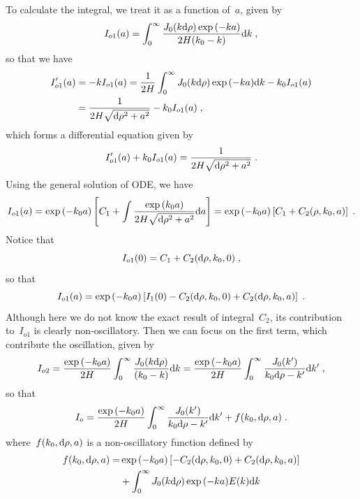 To calculate the integral, we treat it as a function of~$a$, given by
\begin{equation}
    I_{o1}(a) = \int_0^{\infty} \frac{J_0(k \mathrm{d} \rho) \exp{(-k a)}}{2H(k_0 - k)} \text{d}k\;,
\end{equation}
so that we have
\begin{equation}
    \begin{split}
    I_{o1}^{\prime}(a) & = - k I_{o1}(a) = \frac{1}{2H} \int_0^{\infty} J_0(k \mathrm{d} \rho) \exp{(-k a)} \text{d}k - k_0 I_{o1}(a) \\
    & = \frac{1}{2H \sqrt{\mathrm{d} \rho^2 + a^2}} - k_0 I_{o1}(a) \;,
    \end{split}
\end{equation}
which forms a differential equation given by
\begin{equation}
    I_{o1}^{\prime}(a) + k_0 I_{o1}(a) = \frac{1}{2H \sqrt{\mathrm{d} \rho^2 + a^2}}\;.
\end{equation}
Using the general solution of ODE, we have
\begin{equation}
    I_{o1}(a) = \exp{(-k_0 a)} \left[C_1 + \int \frac{\exp{(k_0 a)}}{2H \sqrt{\mathrm{d} \rho^2 + a^2}} \text{d}a \right] = \exp{(-k_0 a)} \left[C_1 + C_2(\rho, k_0, a) \right] \;.
\end{equation}
Notice that
\begin{equation}
    I_{o1}(0) = C_1 + C_2(\mathrm{d} \rho, k_0, 0)\;,
\end{equation}
so that
\begin{equation}
    I_{o1}(a) = \exp{(-k_0 a)} \left[ I_1(0) - C_2(\mathrm{d} \rho, k_0, 0) + C_2(\mathrm{d} \rho, k_0, a) \right]\;.
\end{equation}
Although here we do not know the exact result of integral~$C_2$, its contribution to~$I_{o1}$ is clearly non-oscillatory.
Then we can focus on the first term, which contribute the oscillation, given by 
\begin{equation}
    I_{o2} = \frac{\exp{(-k_0 a)}}{2H} \int_0^{\infty} \frac{J_0(k \mathrm{d} \rho)}{(k_0 - k)} \text{d}k = \frac{\exp{(-k_0 a)}}{2H} \int_0^{\infty} \frac{J_0(k^\prime)}{k_0 \mathrm{d} \rho - k^\prime} \text{d}k^\prime\;,
\end{equation}
so that 
\begin{equation}
    I_o = \frac{\exp{(-k_0 a)}}{2H} \int_0^{\infty} \frac{J_0(k^\prime)}{k_0 \mathrm{d} \rho - k^\prime} \text{d}k^\prime + f(k_0, \mathrm{d} \rho, a)\;.
\end{equation}
where~$f(k_0, \mathrm{d} \rho, a)$ is a non-oscillatory function defined by
\begin{equation}
    \begin{split}
        f(k_0, \mathrm{d} \rho, a) = & \exp{(-k_0 a)} \left[ - C_2(\mathrm{d} \rho, k_0, 0) + C_2(\mathrm{d} \rho, k_0, a) \right] \\
        & + \int_0^{\infty} J_0(k \mathrm{d} \rho) \exp{(-k a)} E(k) \text{d}k
    \end{split}
\end{equation}
